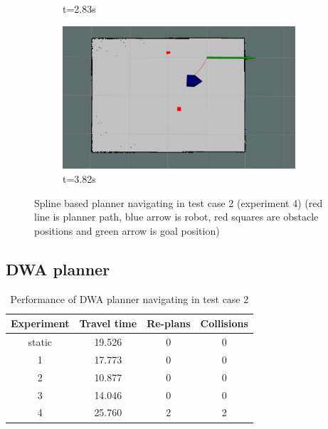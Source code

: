 \begin{figure}[ht]
\begin{subfigure}[b]{0.50\linewidth}
        \caption{t=2.83s}
    \end{subfigure}%
    \begin{subfigure}[b]{0.50\linewidth}
        \centering
        \includegraphics[width=0.95\textwidth]{images/spline_single_2_obs/4/12882.png}
        \caption{t=3.82s}
    \end{subfigure}%
    \caption{Spline based planner navigating in test case 2 (experiment 4) (red line is planner
        path, blue arrow is robot, red squares are obstacle positions and green arrow is goal 
    position)}\label{fig:spline_test_case_2_exp_4}
\end{figure}

\subsection{DWA planner}%
\label{sub:eval_dwa_planner_tc2}

\begin{table}[H]
    \centering
    \begin{tabular}{cccc}
        \textbf{Experiment} & \textbf{Travel time} & \textbf{Re-plans} & \textbf{Collisions} \\\toprule
        static & 19.526 & 0 & 0 \\
             1 & 17.773 & 0 & 0 \\
             2 & 10.877 & 0 & 0 \\
             3 & 14.046 & 0 & 0 \\
             4 & 25.760 & 2 & 2 \\
    \end{tabular}
    \caption{Performance of DWA planner navigating in test case 2}\label{tab:perfomance_dwa_test_case_2}
\end{table}

